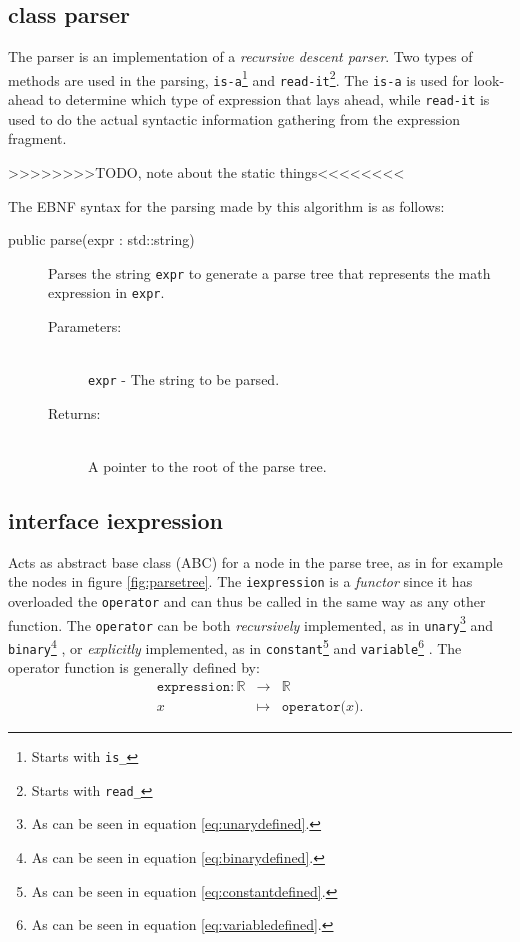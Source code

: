 \documentclass[a4paper,11pt]{kth-mag}
\newcommand{\RR}{\ensuremath{\mathbb{R}}}
\begin{document}
\subsection{class parser}
The parser is an implementation of a \emph{recursive descent parser}. Two
types of methods are used in the parsing, \texttt{is-a}\footnote{Starts with
\texttt{is\_}} and \texttt{read-it}\footnote{Starts with \texttt{read\_}}.
The \texttt{is-a} is used for look-ahead to determine which type of expression
that lays ahead, while \texttt{read-it} is used to do the actual syntactic 
information gathering from the expression fragment.

>>>>>>>>TODO, note about the static things<<<<<<<<

The EBNF syntax for the parsing made by this algorithm is as follows:\\


\begin{description}
    \item[public parse(expr : std::string)] Parses the string \texttt{expr} to
    generate a parse tree that represents the math expression in \texttt{expr}.
    \begin{description}
        \item[Parameters:]~\\
            \verb+expr+ - The string to be parsed.
        \item[Returns:]~\\
            A pointer to the root of the parse tree.
    \end{description}
\end{description}

\subsection{interface iexpression}
\label{sec:iexpression}
Acts as abstract base class (ABC) for a node in the parse
tree, as in for example the nodes in figure \ref{fig:parsetree}. The
\texttt{iexpression} is a \emph{functor} since it has overloaded the
\texttt{operator} and can thus be called in the same way as any other function.
The \texttt{operator} can be both 
\emph{recursively} implemented, as in
    \texttt{unary}\footnote{As can be seen in equation \ref{eq:unarydefined}.} 
    and
    \texttt{binary}\footnote{As can be seen in equation \ref{eq:binarydefined}.}
, or
\emph{explicitly} implemented, as in 
    \texttt{constant}\footnote{As can be seen in equation \ref{eq:constantdefined}.} 
    and
    \texttt{variable}\footnote{As can be seen in equation \ref{eq:variabledefined}.}
.
The operator function is generally defined by:
\begin{eqnarray}
    \label{eq:expressiondefined}
    \texttt{expression}: \RR &\rightarrow& \RR \nonumber \\
    x &\mapsto& \texttt{operator(}x\texttt{)} .
\end{eqnarray}
\end{document}
